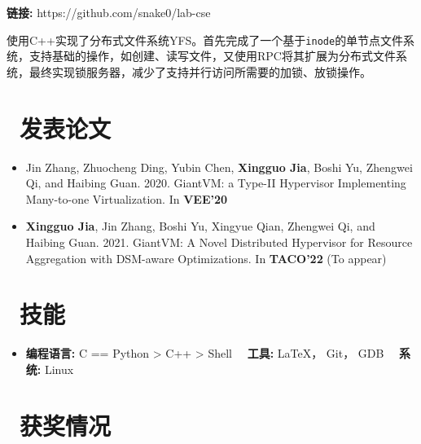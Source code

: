 \documentclass{resume}
\begin{document}
\textbf{链接:} https://github.com/snake0/lab-cse

使用C++实现了分布式文件系统YFS。首先完成了一个基于\texttt{inode}的单节点文件系统，支持基础的操作，如创建、读写文件，又使用RPC将其扩展为分布式文件系统，最终实现锁服务器，减少了支持并行访问所需要的加锁、放锁操作。


\section{\faGraduationCap\ 发表论文}
\begin{itemize}
\item Jin Zhang, Zhuocheng Ding, Yubin Chen, \textbf{Xingguo Jia}, Boshi Yu, Zhengwei Qi, and Haibing Guan. 2020. GiantVM: a Type-II Hypervisor Implementing Many-to-one Virtualization. In \textbf{VEE'20}
\item \textbf{Xingguo Jia}, Jin Zhang, Boshi Yu, Xingyue Qian, Zhengwei Qi, and Haibing Guan. 2021. GiantVM: A Novel Distributed Hypervisor for Resource Aggregation with DSM-aware Optimizations. In \textbf{TACO'22} (To appear)
\end{itemize}


\section{\faCogs\ 技能}
\begin{itemize}[parsep=0.5ex]
  \item \textbf{编程语言:} C == Python > C++ > Shell \ \ \textbf{工具:} \LaTeX， Git， GDB \ \ \textbf{系统:} Linux 
\end{itemize}

\section{\faHeartO\ 获奖情况}

%
%
\end{document}
